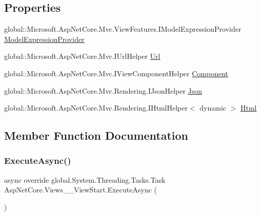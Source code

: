 \subsection*{Properties}
\begin{DoxyCompactItemize}
\item 
global\+::\+Microsoft.\+Asp\+Net\+Core.\+Mvc.\+View\+Features.\+I\+Model\+Expression\+Provider \mbox{\hyperlink{class_asp_net_core_1_1_views_____view_start_a97902ea5e8251ff63e9a2f4dd5389943}{Model\+Expression\+Provider}}
\item 
global\+::\+Microsoft.\+Asp\+Net\+Core.\+Mvc.\+I\+Url\+Helper \mbox{\hyperlink{class_asp_net_core_1_1_views_____view_start_aac82cabef8b298088c0b7a539476bd8b}{Url}}
\item 
global\+::\+Microsoft.\+Asp\+Net\+Core.\+Mvc.\+I\+View\+Component\+Helper \mbox{\hyperlink{class_asp_net_core_1_1_views_____view_start_a8da75bb43bca5132bd26959b13ddc80b}{Component}}
\item 
global\+::\+Microsoft.\+Asp\+Net\+Core.\+Mvc.\+Rendering.\+I\+Json\+Helper \mbox{\hyperlink{class_asp_net_core_1_1_views_____view_start_adfc91850c1c9d9409b39c4924ba516d4}{Json}}
\item 
global\+::\+Microsoft.\+Asp\+Net\+Core.\+Mvc.\+Rendering.\+I\+Html\+Helper$<$ dynamic $>$ \mbox{\hyperlink{class_asp_net_core_1_1_views_____view_start_a9028a34d35592e52ebf62a6600d04aba}{Html}}
\end{DoxyCompactItemize}


\subsection{Member Function Documentation}
\mbox{\label{class_asp_net_core_1_1_views_____view_start_ab3395816bd37d1d7f8ed1bceafaab28f}} 
\subsubsection{\texorpdfstring{ExecuteAsync()}{ExecuteAsync()}}
{\footnotesize\ttfamily async override global.\+System.\+Threading.\+Tasks.\+Task Asp\+Net\+Core.\+Views\+\_\+\+\_\+\+View\+Start.\+Execute\+Async (\begin{DoxyParamCaption}{ }\end{DoxyParamCaption})}



